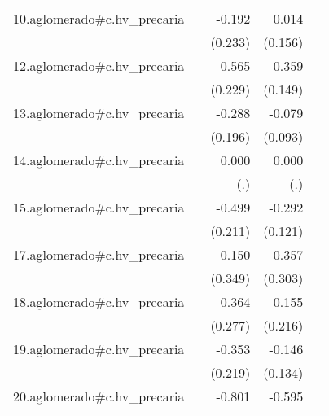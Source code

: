 {\begin{longtable}{l*{4}{D{.}{.}{-1}}}
\addlinespace
10.aglomerado#c.hv\_precaria&                     &      -0.192         &       0.014         &                     \\
            &                     &     (0.233)         &     (0.156)         &                     \\
\addlinespace
12.aglomerado#c.hv\_precaria&                     &      -0.565\sym{*}  &      -0.359\sym{*}  &                     \\
            &                     &     (0.229)         &     (0.149)         &                     \\
\addlinespace
13.aglomerado#c.hv\_precaria&                     &      -0.288         &      -0.079         &                     \\
            &                     &     (0.196)         &     (0.093)         &                     \\
\addlinespace
14.aglomerado#c.hv\_precaria&                     &       0.000         &       0.000         &                     \\
            &                     &         (.)         &         (.)         &                     \\
\addlinespace
15.aglomerado#c.hv\_precaria&                     &      -0.499\sym{*}  &      -0.292\sym{*}  &                     \\
            &                     &     (0.211)         &     (0.121)         &                     \\
\addlinespace
17.aglomerado#c.hv\_precaria&                     &       0.150         &       0.357         &                     \\
            &                     &     (0.349)         &     (0.303)         &                     \\
\addlinespace
18.aglomerado#c.hv\_precaria&                     &      -0.364         &      -0.155         &                     \\
            &                     &     (0.277)         &     (0.216)         &                     \\
\addlinespace
19.aglomerado#c.hv\_precaria&                     &      -0.353         &      -0.146         &                     \\
            &                     &     (0.219)         &     (0.134)         &                     \\
\addlinespace
20.aglomerado#c.hv\_precaria&                     &      -0.801         &      -0.595         &                     \\

\end{longtable}}
